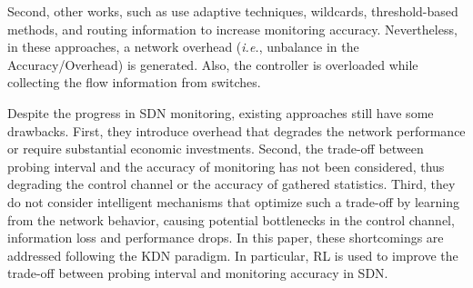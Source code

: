 Second, other works, such as \cite{chowdhury_2014:payless,raumer_2014:monsamp,van_2014:OpenNetMon, tahaei_2017:multi-objective,Tootoonchian_2010:opentm} use adaptive techniques, wildcards, threshold-based methods, and routing information to increase monitoring accuracy. Nevertheless, in these approaches, a network overhead (\textit{i.e.}, unbalance in the Accuracy/Overhead) is generated. Also, the controller is overloaded while collecting the flow information from switches.

Despite the progress in SDN monitoring, existing approaches still have some drawbacks. First, they introduce overhead that degrades the network performance or require substantial economic investments. Second, the trade-off between probing interval and the accuracy of monitoring has not been considered, thus degrading the control channel or the accuracy of gathered statistics. Third, they do not consider intelligent mechanisms that optimize such a trade-off by learning from the network behavior, causing potential bottlenecks in the control channel, information loss and performance drops. 
In this paper, these shortcomings are addressed following the KDN paradigm. In particular, RL is used to improve the trade-off between probing interval and monitoring accuracy in SDN.

